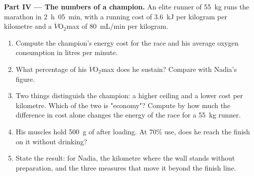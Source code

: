 \begin{problem}
\medskip
\noindent\textbf{Part IV --- The numbers of a champion.}
An elite runner of \qty{55}{kg} runs the marathon in \qty{2}{h}\,
\qty{05}{min}, with a running cost of \qty{3.6}{kJ} per kilogram per
kilometre and a $\dot V\!\mathrm{O_2}$max of \qty{80}{mL/min} per
kilogram.
\begin{enumerate}[resume]
  \item Compute the champion's energy cost for the race and his
        average oxygen consumption in litres per minute.
  \item What percentage of his $\dot V\!\mathrm{O_2}$max does he
        sustain? Compare with Nadia's figure.
  \item Two things distinguish the champion: a higher ceiling and a
        lower cost per kilometre. Which of the two is
        "economy"? Compute by how much the difference in cost alone
        changes the energy of the race for a \qty{55}{kg} runner.
  \item His muscles hold \qty{500}{g} of  after loading. At
        70\%  use, does he reach the finish on it without
        drinking?
  \item State the result: for Nadia, the kilometre where the wall
        stands without preparation, and the three measures that move
        it beyond the finish line.
\end{enumerate}
\end{problem}
